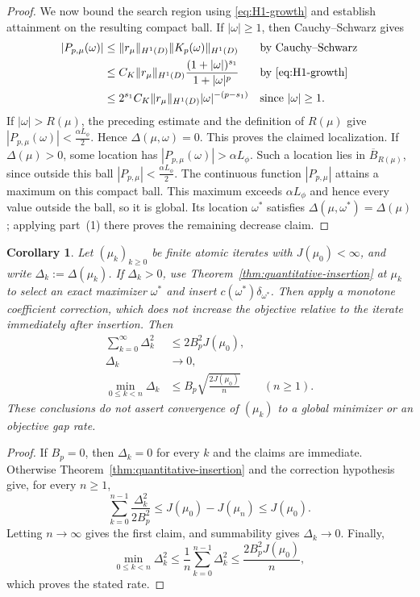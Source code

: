 \documentclass[11pt]{amsart}
\newtheorem{corollary}[theorem]{Corollary}
\theoremstyle{definition}
\theoremstyle{remark}
\begin{document}
\begin{proof}
We now bound the search region using \eqref{eq:H1-growth} and establish
attainment on the resulting compact ball. If $|\omega|\ge1$, then
Cauchy--Schwarz gives
\begin{align*}
	|P_{p,\mu}(\omega)|
	&\le\|r_\mu\|_{H^1(D)}\|K_p(\omega)\|_{H^1(D)}
	&&\text{by Cauchy--Schwarz}\\
	&\le C_K\|r_\mu\|_{H^1(D)}
	\frac{(1+|\omega|)^{s_1}}{1+|\omega|^p}
	&&\text{by \eqref{eq:H1-growth}}\\
	&\le 2^{s_1}C_K\|r_\mu\|_{H^1(D)}|\omega|^{-(p-s_1)}
	&&\text{since $|\omega|\ge1$}.
\end{align*}
If $|\omega|>R(\mu)$, the preceding estimate and the definition of $R(\mu)$
give $|P_{p,\mu}(\omega)|<\frac{\alpha L_\phi}{2}$.
Hence $\Delta(\mu,\omega)=0$. This proves the claimed localization.
If $\Delta(\mu)>0$, some location has
$|P_{p,\mu}(\omega)|>\alpha L_\phi$. Such a location lies in
$\overline B_{R(\mu)}$, since outside this ball
$|P_{p,\mu}|<\frac{\alpha L_\phi}{2}$.
The continuous function $|P_{p,\mu}|$ attains a maximum on this compact ball.
This maximum exceeds $\alpha L_\phi$ and hence every value outside the ball,
so it is global. Its location $\omega^*$ satisfies
$\Delta(\mu,\omega^*)=\Delta(\mu)$; applying part~(1) there proves the
remaining decrease claim.
\end{proof}

\begin{corollary}
\label{cor:certificate-rate}
Let $(\mu_k)_{k\ge0}$ be finite atomic iterates with $J(\mu_0)<\infty$, and
write $\Delta_k:=\Delta(\mu_k)$. If $\Delta_k>0$, use
Theorem~\ref{thm:quantitative-insertion} at $\mu_k$ to select an exact
maximizer $\omega^*$ and insert $c(\omega^*)\delta_{\omega^*}$.
Then apply a monotone coefficient correction, which does not increase the
objective relative to the iterate immediately after insertion. Then
\begin{align*}
	\sum_{k=0}^{\infty}\Delta_k^2
	&\le 2B_p^2J(\mu_0),\\
	\Delta_k&\longrightarrow0,\\
	\min_{0\le k<n}\Delta_k
	&\le B_p\sqrt{\frac{2J(\mu_0)}{n}}
	\qquad(n\ge1).
\end{align*}
These conclusions do not assert convergence of $(\mu_k)$ to a global
minimizer or an objective gap rate.
\end{corollary}

\begin{proof}
If $B_p=0$, then $\Delta_k=0$ for every $k$ and the claims are immediate.
Otherwise Theorem~\ref{thm:quantitative-insertion} and the correction
hypothesis give, for every $n\ge1$,
\begin{equation*}
	\sum_{k=0}^{n-1}\frac{\Delta_k^2}{2B_p^2}
	\le J(\mu_0)-J(\mu_n)
	\le J(\mu_0).
\end{equation*}
Letting $n\to\infty$ gives the first claim, and summability gives
$\Delta_k\to0$. Finally,
\begin{equation*}
	\min_{0\le k<n}\Delta_k^2
	\le\frac1n\sum_{k=0}^{n-1}\Delta_k^2
	\le\frac{2B_p^2J(\mu_0)}n,
\end{equation*}
which proves the stated rate.
\end{proof}
\end{document}
